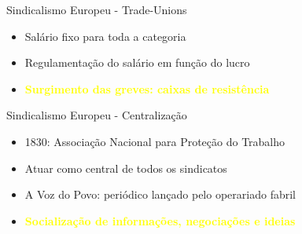\begin{frame}{Sindicalismo Europeu - Trade-Unions}
    \begin{itemize}
        \item Salário fixo para toda a categoria
        \item Regulamentação do salário em função do lucro
        \item \textbf{\textcolor{yellow}{Surgimento das greves: caixas de resistência}}
    \end{itemize}
\end{frame}

\begin{frame}{Sindicalismo Europeu - Centralização}
    \begin{itemize}
        \item 1830: Associação Nacional para Proteção do Trabalho
        \item Atuar como central de todos os sindicatos
        \item A Voz do Povo: periódico lançado pelo operariado fabril
        \item \textbf{\textcolor{yellow}{Socialização de informações, negociações e ideias}}
    \end{itemize}
\end{frame}


